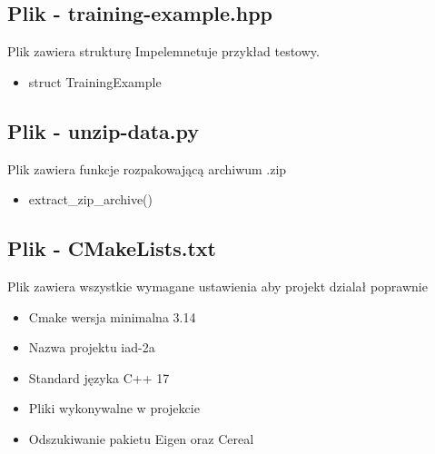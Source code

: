 \documentclass{classrep}
\begin{document}
{        \subsection{Plik - training-example.hpp}
        {
            Plik zawiera strukturę
            Impelemnetuje przykład testowy.
            \begin{itemize}
                \item struct TrainingExample
            \end{itemize}
        }

        \subsection{Plik - unzip-data.py}
        {
            Plik zawiera funkcje rozpakowającą archiwum .zip
            \begin{itemize}
                \item extract\_zip\_archive()
            \end{itemize}
        }

        \subsection{Plik - CMakeLists.txt}
        {
            Plik zawiera wszystkie wymagane ustawienia aby projekt dzialał poprawnie
            \begin{itemize}
                \item Cmake wersja minimalna 3.14
                \item Nazwa projektu iad-2a
                \item Standard języka C++ 17
                \item Pliki wykonywalne w projekcie
                \item Odszukiwanie pakietu Eigen oraz Cereal
            \end{itemize}
        }
    }
\end{document}
